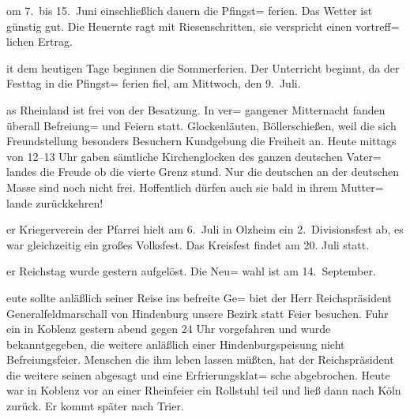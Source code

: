 

%
om 7.\ bis 15.\ Juni einschließlich dauern die Pfingst=\ob
ferien. Das Wetter ist günstig gut. Die Heuernte\ob
ragt mit Riesenschritten, sie verspricht einen vortreff=\ob
lichen Ertrag.

%
it dem heutigen Tage beginnen die Sommerferien.\ob
Der Unterricht beginnt, da der Festtag in die Pfingst=\ob
ferien fiel, am Mittwoch, den 9.\ Juli.

%
as Rheinland ist frei von der Besatzung. In ver=\ob
gangener Mitternacht fanden überall Befreiung=\ob
und Feiern statt. Glockenläuten, Böllerschießen,\ob
weil die sich Freundstellung besonders Besuchern Kundgebung\ob
die Freiheit an. Heute mittags von 12--13 Uhr gaben\ob
sämtliche Kirchenglocken des ganzen deutschen Vater=\ob
landes die Freude ob die vierte Grenz stund. Nur die\ob
deutschen an der deutschen Masse sind noch nicht frei.\ob
Hoffentlich dürfen auch sie bald in ihrem Mutter=\ob
lande zurückkehren!

%
er Kriegerverein der Pfarrei hielt am 6.\ Juli in\ob
Olzheim ein 2.\ Divisionsfest ab, es war gleichzeitig ein\ob
großes Volksfest. Das Kreisfest findet am 20.\ob
Juli statt.

%
er Reichstag wurde gestern aufgelöst. Die Neu=\ob
wahl ist am 14.\ September.

%
eute sollte anläßlich seiner Reise ins befreite Ge=\ob
biet der Herr Reichspräsident Generalfeldmarschall\ob
von Hindenburg unsere Bezirk statt Feier besuchen. Fuhr\ob
ein in Koblenz gestern abend gegen 24 Uhr vorgefahren und\ob
wurde bekanntgegeben, die weitere anläßlich einer\ob
Hindenburgspeisung nicht Befreiungsfeier. Menschen\ob
die ihm leben lassen müßten, hat der Reichspräsident\ob
die weitere seinen abgesagt und eine Erfrierungsklat=\ob
sche abgebrochen. Heute war in Koblenz vor an einer\ob
Rheinfeier ein Rollstuhl teil und ließ dann nach\ob
Köln zurück. Er kommt später nach Trier.
\pend
